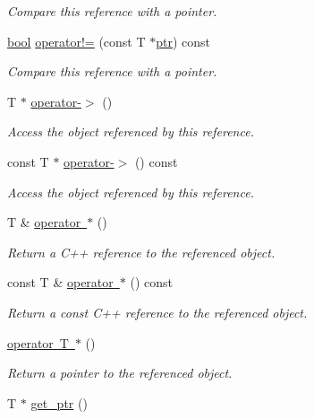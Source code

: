 \begin{DoxyCompactItemize}
\begin{DoxyCompactList}\small\item\em Compare this reference with a pointer. \end{DoxyCompactList}\item 
\mbox{\hyperlink{asdl_8h_af6a258d8f3ee5206d682d799316314b1}{bool}} \mbox{\hyperlink{classref_a932a54e9c0e107e7edf78d550ef4852f}{operator!=}} (const T $\ast$\mbox{\hyperlink{pystrtod_8h_a671b2e1a427060ad8b5362882ed58f5b}{ptr}}) const
\begin{DoxyCompactList}\small\item\em Compare this reference with a pointer. \end{DoxyCompactList}\item 
T $\ast$ \mbox{\hyperlink{classref_acc07281f5c8afd7660e0965da19a2c0c}{operator-\/$>$}} ()
\begin{DoxyCompactList}\small\item\em Access the object referenced by this reference. \end{DoxyCompactList}\item 
const T $\ast$ \mbox{\hyperlink{classref_a2b60a27dafb793f808195c2ddfd8d013}{operator-\/$>$}} () const
\begin{DoxyCompactList}\small\item\em Access the object referenced by this reference. \end{DoxyCompactList}\item 
T \& \mbox{\hyperlink{classref_a38e0c7c7edd142e8f57365866060c64a}{operator $\ast$}} ()
\begin{DoxyCompactList}\small\item\em Return a C++ reference to the referenced object. \end{DoxyCompactList}\item 
const T \& \mbox{\hyperlink{classref_a600454c0804772ec0b144ebddcfce263}{operator $\ast$}} () const
\begin{DoxyCompactList}\small\item\em Return a const C++ reference to the referenced object. \end{DoxyCompactList}\item 
\mbox{\hyperlink{classref_a67b4f9ea37f8b63ea1a6638f228d8b5a}{operator T $\ast$}} ()
\begin{DoxyCompactList}\small\item\em Return a pointer to the referenced object. \end{DoxyCompactList}\item 
T $\ast$ \mbox{\hyperlink{classref_ad70261d8ee00b42350f69c96be30beaa}{get\+\_\+ptr}} ()

\end{DoxyCompactItemize}
